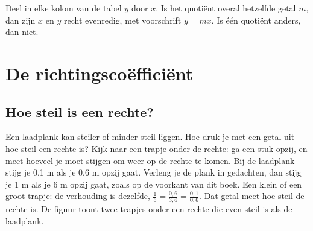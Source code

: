
\begin{werkwijze}
Deel in elke kolom van de tabel $y$ door $x$. Is het quotiënt overal hetzelfde getal $m$, dan zijn $x$ en $y$ recht evenredig, met voorschrift $y = mx$. Is één quotiënt anders, dan niet.
\end{werkwijze}

\begin{oefeningen}
\end{oefeningen}

\section{De richtingscoëfficiënt}

\subsection{Hoe steil is een rechte?}

Een laadplank kan steiler of minder steil liggen. Hoe druk je met een getal uit hoe steil een rechte is? Kijk naar een trapje onder de rechte: ga een stuk opzij, en meet hoeveel je moet stijgen om weer op de rechte te komen. Bij de laadplank stijg je 0,1 m als je 0,6 m opzij gaat. Verleng je de plank in gedachten, dan stijg je 1 m als je 6 m opzij gaat, zoals op de voorkant van dit boek. Een klein of een groot trapje: de verhouding is dezelfde, $\tfrac{1}{6} = \tfrac{0,6}{3,6} = \tfrac{0,1}{0,6}$. Dat getal meet hoe steil de rechte is. De figuur toont twee trapjes onder een rechte die even steil is als de laadplank.



